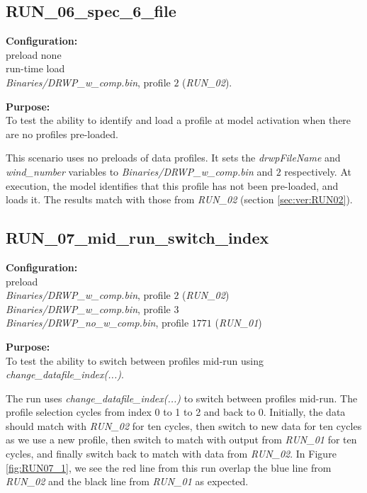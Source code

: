 \documentclass[11pt,fleqn]{report}
\begin{document}
\subsection{RUN\_06\_spec\_6\_file}
\textbf{Configuration:}\\ preload none\\
run-time load\\
\textit{Binaries/DRWP\_w\_comp.bin}, profile $2$ (\textit{RUN\_02}).

\textbf{Purpose:}\\ To test the ability to identify and load a profile at model
activation when there are no profiles pre-loaded.

This scenario uses no preloads of data profiles.
It sets the \textit{drwpFileName} and \textit{wind\_number}
variables to \textit{Binaries/DRWP\_w\_comp.bin} and $2$ respectively.
At execution, the model identifies that this profile has not been pre-loaded,
and loads it.
The results match with those from \textit{RUN\_02} (section
\ref{sec:ver:RUN02}).


\subsection{RUN\_07\_mid\_run\_switch\_index} \label{sec:verif:RUN07}
\textbf{Configuration:}\\ preload\\
\textit{Binaries/DRWP\_w\_comp.bin}, profile $2$ (\textit{RUN\_02})\\
\textit{Binaries/DRWP\_w\_comp.bin}, profile $3$\\
\textit{Binaries/DRWP\_no\_w\_comp.bin}, profile $1771$ (\textit{RUN\_01})

\textbf{Purpose:}\\ To test the ability to switch between profiles
mid-run using \textit{change\_datafile\_index(...)}.

The run uses \textit{change\_datafile\_index(...)} to switch between
profiles mid-run. The profile selection cycles from
index 0 to 1 to 2 and back to 0.
Initially, the data should match with \textit{RUN\_02} for ten cycles, then
switch to new data for ten cycles as we use a new profile, then switch to
match with output from \textit{RUN\_01} for ten cycles, and finally switch
back to match with data from \textit{RUN\_02}. In Figure \ref{fig:RUN07_1},
we see the red line from this run overlap the blue line from
\textit{RUN\_02} and the black line from \textit{RUN\_01} as expected.
\end{document}
